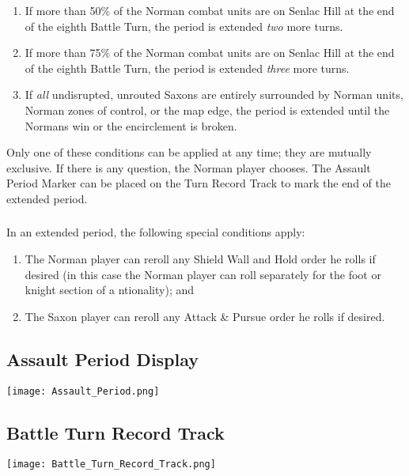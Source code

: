 \begin{enumerate}[label=*]
    \item If more than 50\% of the Norman combat units are on Senlac Hill at the end of the eighth Battle Turn, the period is extended \textit{two} more turns.
    \item If more than 75\% of the Norman combat units are on Senlac Hill at the end of the eighth Battle Turn, the period is extended \textit{three} more turns.
    \item If \textit{all} undisrupted, unrouted Saxons are entirely surrounded by Norman units, Norman zones of control, or the map edge, the period is extended until the Normans win or the encirclement is broken.
\end{enumerate}

Only one of these conditions can be applied at any time; they are mutually exclusive. If there is any question, the Norman player chooses. The Assault Period Marker can be placed on the Turn Record Track to mark the end of the extended period.

\subsubsection{} In an extended period, the following special conditions apply:

\begin{enumerate}[label=*]
    \item The Norman player can reroll any Shield Wall and Hold order he rolls if desired (in this case the Norman player can roll separately for the foot or knight section of a ntionality); and
    \item The Saxon player can reroll any Attack \& Pursue order he rolls if desired.
\end{enumerate}

\subsection{Assault Period Display}

\begin{center}
  \texttt{[image: Assault\_Period.png]}
\end{center}

\subsection{Battle Turn Record Track}

\begin{center}
    \texttt{[image: Battle\_Turn\_Record\_Track.png]}
\end{center}